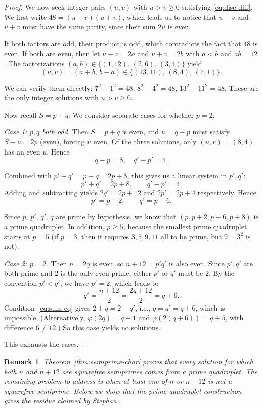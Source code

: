 \documentclass[12pt, twoside]{amsart}
\newtheorem{remark}[theorem]{Remark}
\theoremstyle{definition}
\begin{document}
\begin{proof}
We now seek integer pairs $(u, v)$ with $u > v \ge 0$ satisfying \eqref{eq:disc-diff}. We first write $48 = (u-v)(u+v)$, which leads us to notice that $u-v$ and $u+v$ must have the same parity, since their sum $2u$ is even. 

If both factors are odd, their product is odd, which contradicts the fact that $48$ is even. If both are even, then let $u - v = 2a$ and $u + v = 2b$ with $a < b$ and $ab = 12$. The factorizations $(a, b) \in \{(1, 12),\, (2, 6),\, (3, 4)\}$ yield
\[
(u, v) = (a + b,\, b - a) \in \{(13, 11),\, (8, 4),\, (7, 1)\}.
\]

We can verify them directly: $7^2 - 1^2 = 48$, $8^2 - 4^2 = 48$, $13^2 - 11^2 = 48$. These are the only integer solutions with $u > v \ge 0$.

Now recall $S = p + q$. We consider separate cases for whether $p = 2$:

\emph{Case 1: $p, q$ both odd.} Then $S = p+q$ is even, and $u = q - p$ must satisfy $S - u = 2p$ (even), forcing $u$ even. Of the three solutions, only $(u, v) = (8, 4)$ has an even $u$. Hence
\[
q - p = 8, \quad q' - p' = 4.
\]
\begin{samepage}
Combined with $p' + q' = p + q = 2p + 8$, this gives us a linear system in $p', q'$:
\[
p' + q' = 2p + 8, \qquad q' - p' = 4.
\]
Adding and subtracting yields $2q' = 2p + 12$ and $2p' = 2p + 4$ respectively. Hence
\[
p' = p + 2, \qquad q' = p + 6.
\]
\end{samepage}
Since $p, \, p', \, q', \, q$ are prime by hypothesis, we know that $(p, p+2, p+6, p+8)$ is a prime quadruplet. In addition, $p \ge 5$, because the smallest prime quadruplet starts at $p = 5$ (if $p = 3$, then it requires $3, 5, 9, 11$ all to be prime, but $9 = 3^2$ is not).

\emph{Case 2: $p = 2$.} Then $n = 2q$ is even, so $n + 12 = p'q'$ is also even. Since $p', q'$ are both prime and $2$ is the only even prime, either $p'$ or $q'$ must be $2$. By the convention $p' < q'$, we have $p' = 2$, which leads to
\[
q' = \frac{n+12}2 = \frac{2q+12}2 = q + 6.
\] 
Condition~\eqref{eq:sum-eq} gives $2 + q = 2 + q'$, i.e., $q = q' = q + 6$, which is impossible. (Alternatively, $\varphi(2q) = q - 1$ and $\varphi(2(q+6)) = q + 5$, with difference $6 \neq 12$.) So this case yields no solutions.
 
This exhausts the cases.
\end{proof}

\begin{remark}
Theorem~\ref{thm:semiprime-char} proves that every solution for which both $n$ and $n+12$ are squarefree semiprimes comes from a prime quadruplet. The remaining problem to address is when at least one of $n$ or $n+12$ is not a squarefree semiprime. Below we show that the prime quadruplet construction gives the residue claimed by Stephan.
\end{remark}
\end{document}
